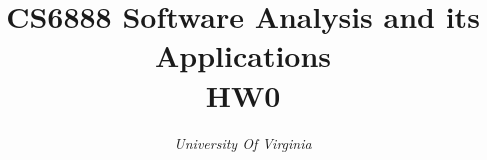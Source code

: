 \documentclass[conference]{IEEEtran}
\begin{document}
\title{CS6888 Software Analysis and its Applications \\ HW0\\
}

\author{
\textit{University Of Virginia}\\
}

\maketitle
\end{document}
